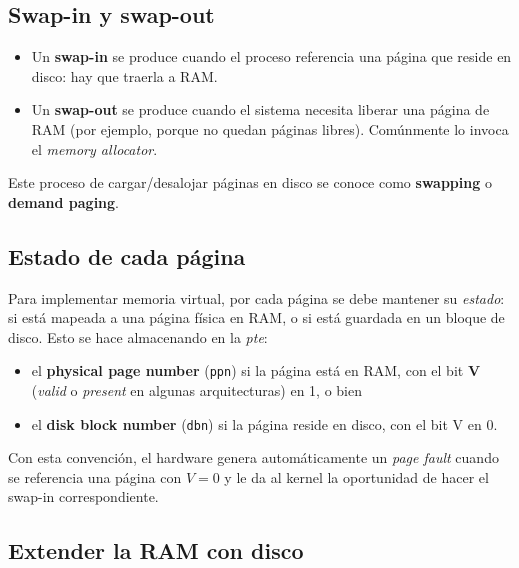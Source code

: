 \documentclass[11pt,a4paper]{article}
\begin{document}
\subsection{Swap-in y swap-out}

\begin{itemize}[leftmargin=*]
    \item Un \textbf{swap-in} se produce cuando el proceso referencia
        una página que reside en disco: hay que traerla a RAM.
    \item Un \textbf{swap-out} se produce cuando el sistema necesita
        liberar una página de RAM (por ejemplo, porque no quedan
        páginas libres). Comúnmente lo invoca el \emph{memory
        allocator}.
\end{itemize}

Este proceso de cargar/desalojar páginas en disco se conoce como
\textbf{swapping} o \textbf{demand paging}.

\subsection{Estado de cada página}

Para implementar memoria virtual, por cada página se debe mantener su
\emph{estado}: si está mapeada a una página física en RAM, o si está
guardada en un bloque de disco. Esto se hace almacenando en la
\emph{pte}:

\begin{itemize}[leftmargin=*,nosep]
    \item el \textbf{physical page number} (\texttt{ppn}) si la página
        está en RAM, con el bit \textbf{V} (\emph{valid} o
        \emph{present} en algunas arquitecturas) en 1, o bien
    \item el \textbf{disk block number} (\texttt{dbn}) si la página
        reside en disco, con el bit V en 0.
\end{itemize}

Con esta convención, el hardware genera automáticamente un
\emph{page fault} cuando se referencia una página con $V=0$ y le da al
kernel la oportunidad de hacer el swap-in correspondiente.

\subsection{Extender la RAM con disco}
\end{document}
